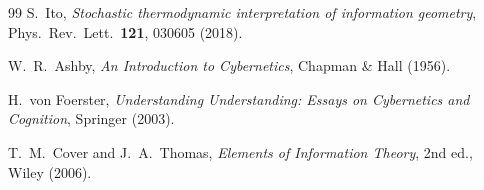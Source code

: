 \documentclass[12pt]{article}
\theoremstyle{definition}
\begin{document}
\begin{thebibliography}{99}
S.~Ito,
\emph{Stochastic thermodynamic interpretation of information geometry},
Phys.\ Rev.\ Lett.\ \textbf{121}, 030605 (2018).

W.~R.~Ashby,
\emph{An Introduction to Cybernetics}, Chapman \& Hall (1956).

H.~von Foerster,
\emph{Understanding Understanding: Essays on Cybernetics and Cognition}, Springer (2003).

T.~M.~Cover and J.~A.~Thomas,
\emph{Elements of Information Theory}, 2nd ed., Wiley (2006).

\end{thebibliography}
\end{document}

